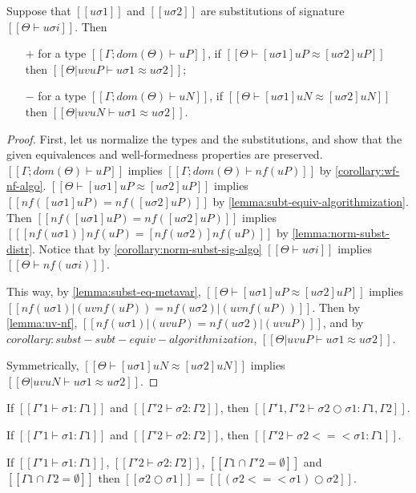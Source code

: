 \begin{corollary}
  \label{lemma:subst-equiv-metavar}
  Suppose that $[[uσ1]]$ and $[[uσ2]]$ are substitutions 
  of signature $[[Θ ⊢ uσi]]$.
  Then 
  \begin{enumerate}
    \item [$+$] for a type $[[Γ; dom(Θ) ⊢ uP]]$, if $[[Θ ⊢ [uσ1]uP ≈ [uσ2]uP]]$ then
      $[[Θ|uv uP ⊢ uσ1 ≈ uσ2]]$;
    \item [$-$] for a type $[[Γ; dom(Θ) ⊢ uN]]$, if $[[Θ ⊢ [uσ1]uN ≈ [uσ2]uN]]$ then
      $[[Θ|uv uN ⊢ uσ1 ≈ uσ2]]$.
  \end{enumerate}
\end{corollary}
\begin{proof}
  First, let us normalize the types and the substitutions, and show that
  the given equivalences and well-formedness properties are preserved. 
  $[[Γ; dom(Θ) ⊢ uP]]$ implies $[[Γ; dom(Θ) ⊢ nf(uP)]]$ by \cref{corollary:wf-nf-algo}.
  $[[Θ ⊢ [uσ1]uP ≈ [uσ2]uP]]$ implies $[[ nf([uσ1]uP) = nf([uσ2]uP)]]$ by 
  \cref{lemma:subt-equiv-algorithmization}.
  Then $[[ nf([uσ1]uP) = nf([uσ2]uP)]]$ implies 
  $[[ [nf(uσ1)]nf(uP) = [nf(uσ2)]nf(uP)]]$ by \cref{lemma:norm-subst-distr}.
  Notice that by \cref{corollary:norm-subst-sig-algo}
  $[[Θ ⊢ uσi]]$ implies $[[Θ ⊢ nf(uσi)]]$.

  This way, by \cref{lemma:subst-eq-metavar}, 
  $[[Θ ⊢ [uσ1]uP ≈ [uσ2]uP]]$ implies 
  $[[nf(uσ1)|(uv nf(uP)) = nf(uσ2)|(uv nf(uP))]]$.
  Then by \cref{lemma:uv-nf}, 
  $[[nf(uσ1)|(uv uP) = nf(uσ2)|(uv uP)]]$,
  and by ${{corollary:subst-subt-equiv-algorithmization}}$,
  $[[Θ|uv uP ⊢ uσ1 ≈ uσ2]]$.

  Symmetrically, 
  $[[Θ ⊢ [uσ1]uN ≈ [uσ2]uN]]$ implies 
  $[[Θ|uv uN ⊢ uσ1 ≈ uσ2]]$.
\end{proof}

\begin{lemma}
  If $[[Γ'1 ⊢ σ1 : Γ1]]$ and $[[Γ'2 ⊢ σ2 : Γ2]]$,
  then $[[Γ'1, Γ'2 ⊢ σ2 ○ σ1 : Γ1, Γ2]]$.
\end{lemma}

\begin{lemma}
  \label{lemma:subst-monad-composition-wf}
  If $[[Γ'1 ⊢ σ1 : Γ1]]$ and $[[Γ'2 ⊢ σ2 : Γ2]]$,
  then $[[Γ'2 ⊢ σ2 <=< σ1 : Γ1]]$.
\end{lemma}

\begin{lemma}
  \label{lemma:subst-composition}
    If $[[Γ'1 ⊢ σ1 : Γ1]]$, $[[Γ'2 ⊢ σ2 : Γ2]]$, 
    $[[{Γ1} ∩ {Γ'2} = ∅ ]]$ and $[[ {Γ1} ∩ {Γ2} = ∅ ]]$ then 
    $[[ σ2 ○ σ1 ]] = [[ (σ2 <=< σ1) ○ σ2 ]]$.
\end{lemma}

